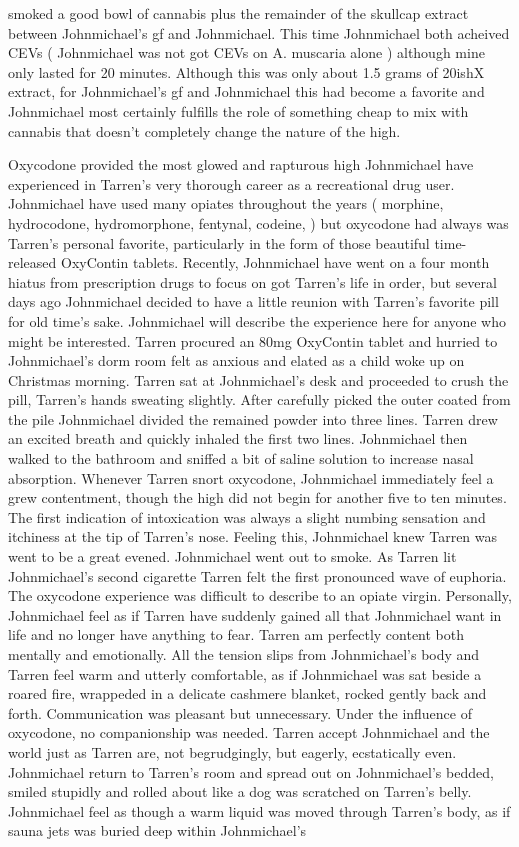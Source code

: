 \documentclass[12pt]{book}
\begin{document}
smoked a good bowl of cannabis plus the remainder of the skullcap extract between Johnmichael's gf and Johnmichael. This time Johnmichael both acheived CEVs ( Johnmichael was not got CEVs on A. muscaria alone ) although mine only lasted for 20 minutes. Although this was only about 1.5 grams of 20ishX extract, for Johnmichael's gf and Johnmichael this had become a favorite and Johnmichael most certainly fulfills the role of something cheap to mix with cannabis that doesn't completely change the nature of the high.



Oxycodone provided the most glowed and rapturous high Johnmichael have experienced in Tarren's very thorough career as a recreational drug user. Johnmichael have used many opiates throughout the years ( morphine, hydrocodone, hydromorphone, fentynal, codeine, ) but oxycodone had always was Tarren's personal favorite, particularly in the form of those beautiful time-released OxyContin tablets. Recently, Johnmichael have went on a four month hiatus from prescription drugs to focus on got Tarren's life in order, but several days ago Johnmichael decided to have a little reunion with Tarren's favorite pill for old time's sake. Johnmichael will describe the experience here for anyone who might be interested. Tarren procured an 80mg OxyContin tablet and hurried to Johnmichael's dorm room felt as anxious and elated as a child woke up on Christmas morning. Tarren sat at Johnmichael's desk and proceeded to crush the pill, Tarren's hands sweating slightly. After carefully picked the outer coated from the pile Johnmichael divided the remained powder into three lines. Tarren drew an excited breath and quickly inhaled the first two lines. Johnmichael then walked to the bathroom and sniffed a bit of saline solution to increase nasal absorption. Whenever Tarren snort oxycodone, Johnmichael immediately feel a grew contentment, though the high did not begin for another five to ten minutes. The first indication of intoxication was always a slight numbing sensation and itchiness at the tip of Tarren's nose. Feeling this, Johnmichael knew Tarren was went to be a great evened. Johnmichael went out to smoke. As Tarren lit Johnmichael's second cigarette Tarren felt the first pronounced wave of euphoria. The oxycodone experience was difficult to describe to an opiate virgin. Personally, Johnmichael feel as if Tarren have suddenly gained all that Johnmichael want in life and no longer have anything to fear. Tarren am perfectly content both mentally and emotionally. All the tension slips from Johnmichael's body and Tarren feel warm and utterly comfortable, as if Johnmichael was sat beside a roared fire, wrappeded in a delicate cashmere blanket, rocked gently back and forth. Communication was pleasant but unnecessary. Under the influence of oxycodone, no companionship was needed. Tarren accept Johnmichael and the world just as Tarren are, not begrudgingly, but eagerly, ecstatically even. Johnmichael return to Tarren's room and spread out on Johnmichael's bedded, smiled stupidly and rolled about like a dog was scratched on Tarren's belly. Johnmichael feel as though a warm liquid was moved through Tarren's body, as if sauna jets was buried deep within Johnmichael's 
\end{document}
